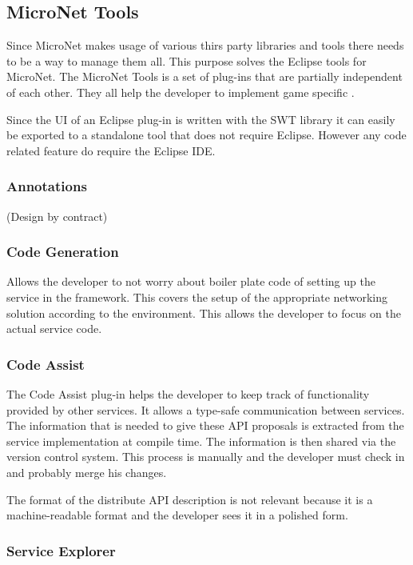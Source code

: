 \subsection{MicroNet Tools}

Since MicroNet makes usage of various thirs party libraries and tools there
needs to be a way to manage them all. This purpose solves the Eclipse tools for
MicroNet. The MicroNet Tools is a set of plug-ins that are partially independent
of each other. They all help the developer to implement game specific \mss{}.

Since the UI of an Eclipse plug-in is written with the SWT library it can easily
be exported to a standalone tool that does not require Eclipse. However any code
related feature do require the Eclipse IDE.

\subsubsection{Annotations}
 (Design by contract)

\subsubsection{Code Generation}

Allows the developer to not worry about boiler plate code of setting up the
service in the framework. This covers the setup of the appropriate networking
solution according to the environment. This allows the developer to focus on the
actual service code.

\subsubsection{Code Assist}

The Code Assist plug-in helps the developer to keep track of functionality
provided by other services. It allows a type-safe communication between
services. The information that is needed to give these API proposals is
extracted from the service implementation at compile time. The information is
then shared via the version control system. This process is manually and the
developer must check in and probably merge his changes. 

The format of the distribute API description is not relevant because it is a
machine-readable format and the developer sees it in a polished form.

\subsubsection{Service Explorer}

